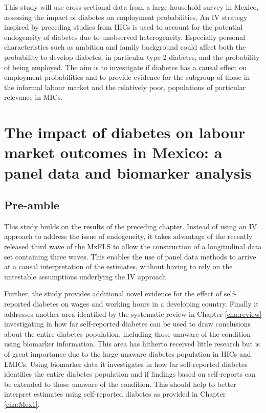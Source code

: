 This study will use cross-sectional data from a large household survey in Mexico, assessing the impact of diabetes on employment probabilities. An \ac{IV} strategy inspired by preceding studies from \acp{HIC} is used to account for the potential endogeneity of diabetes due to unobserved heterogeneity. Especially personal characteristics such as ambition and family background could affect both the probability to develop diabetes, in particular type 2 diabetes, and the probability of being employed. The aim is to investigate if diabetes has a causal effect on employment probabilities and to provide evidence for the subgroup of those in the informal labour market and the relatively poor, populations of particular relevance in \acp{MIC}.

\acresetall  %
\chapter{\label{cha:Mex2}The impact of diabetes on labour market outcomes in Mexico: a panel data and biomarker analysis}
\section*{Pre-amble}

This study builds on the results of the preceding chapter. Instead of using an \ac{IV} approach to address the issue of endogeneity, it takes advantage of the recently released third wave of the \ac{MxFLS} to allow the construction of a longitudinal data set containing three waves. This enables the use of panel data methods to arrive at a causal interpretation of the estimates, without having to rely on the untestable assumptions underlying the \ac{IV} approach.

Further, the study provides additional novel evidence for the effect of self-reported diabetes on wages and working hours in a developing country. Finally it addresses another area identified by the systematic review in Chapter \ref{cha:review} investigating in how far self-reported diabetes can be used to draw conclusions about the entire diabetes population, including those unaware of the condition using biomarker information. This area has hitherto received little research but is of great importance due to the large unaware diabetes population in \acp{HIC} and \acp{LMIC}. Using biomarker data it investigates in how far self-reported diabetes identifies the entire diabetes population and if findings based on self-reports can be extended to those unaware of the condition. This should help to better interpret estimates using self-reported diabetes as provided in Chapter \ref{cha:Mex1}.

